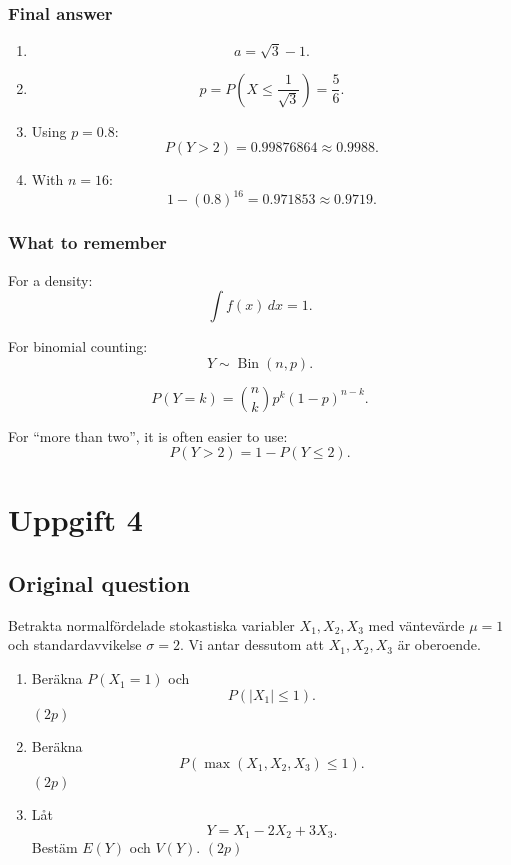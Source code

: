 \documentclass[10pt]{article}
\begin{document}
\subsubsection*{Final answer}

\begin{enumerate}[label=\alph*)]
\item
\[
a=\sqrt{3}-1.
\]

\item
\[
p=P\left(X\le \frac{1}{\sqrt{3}}\right)
=\frac{5}{6}.
\]

\item
Using \(p=0.8\):
\[
P(Y>2)=0.99876864
\approx 0.9988.
\]

\item
With \(n=16\):
\[
1-(0.8)^{16}
=0.971853
\approx 0.9719.
\]
\end{enumerate}

\subsubsection*{What to remember}

For a density:
\[
\int f(x)\,dx=1.
\]

For binomial counting:
\[
Y\sim \operatorname{Bin}(n,p).
\]

\[
P(Y=k)
=
\binom{n}{k}
p^k(1-p)^{n-k}.
\]

For ``more than two'', it is often easier to use:
\[
P(Y>2)=1-P(Y\le 2).
\]

\section*{Uppgift 4}

\subsection*{Original question}

Betrakta normalfördelade stokastiska variabler
\(X_1,X_2,X_3\) med väntevärde \(\mu=1\) och
standardavvikelse \(\sigma=2\). Vi antar dessutom
att \(X_1,X_2,X_3\) är oberoende.

\begin{enumerate}[label=\alph*)]
\item Beräkna \(P(X_1=1)\) och
\[
P(|X_1|\le 1).
\]
\((2p)\)

\item Beräkna
\[
P(\max(X_1,X_2,X_3)\le 1).
\]
\((2p)\)

\item Låt
\[
Y=X_1-2X_2+3X_3.
\]
Bestäm \(E(Y)\) och \(V(Y)\). \((2p)\)
\end{enumerate}
\end{document}

